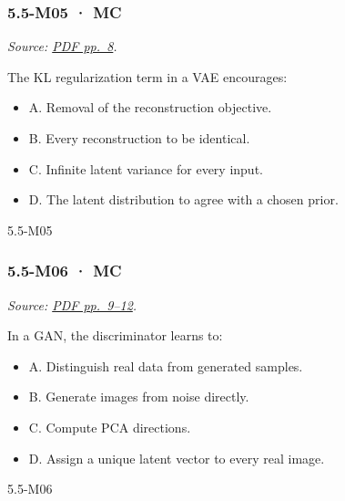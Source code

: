 \noindent\begin{minipage}{\linewidth}

\subsubsection{5.5-M05 · MC}\label{m05-mc-16}

\emph{Source:
\href{../Lecture\%20Slides/5.5.\%20Generative\%20Models.pdf\#page=8}{PDF
pp.~8}.}

The KL regularization term in a VAE encourages:

\begin{itemize}
\tightlist
\item
  A. Removal of the reconstruction objective.
\item
  B. Every reconstruction to be identical.
\item
  C. Infinite latent variance for every input.
\item
  D. The latent distribution to agree with a chosen prior.
\end{itemize}

\begin{solution}[8mm]{5.5-M05}

\end{solution}
\end{minipage}\par\medskip

\noindent\begin{minipage}{\linewidth}

\subsubsection{5.5-M06 · MC}\label{m06-mc-16}

\emph{Source:
\href{../Lecture\%20Slides/5.5.\%20Generative\%20Models.pdf\#page=9}{PDF
pp.~9--12}.}

In a GAN, the discriminator learns to:

\begin{itemize}
\tightlist
\item
  A. Distinguish real data from generated samples.
\item
  B. Generate images from noise directly.
\item
  C. Compute PCA directions.
\item
  D. Assign a unique latent vector to every real image.
\end{itemize}

\begin{solution}[8mm]{5.5-M06}

\end{solution}
\end{minipage}\par\medskip

